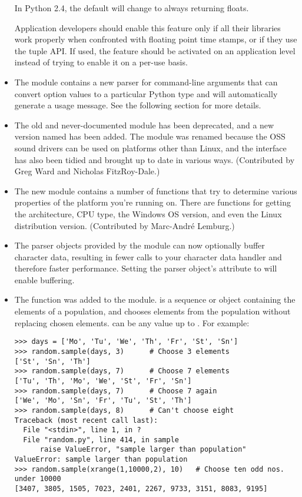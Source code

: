\documentclass{howto}
\begin{document}
\begin{itemize}
In Python 2.4, the default will change to always returning floats.

Application developers should enable this feature only if all their
libraries work properly when confronted with floating point time
stamps, or if they use the tuple API. If used, the feature should be
activated on an application level instead of trying to enable it on a
per-use basis.

\item The  module contains a new parser for command-line arguments 
that can convert option values to a particular Python type 
and will automatically generate a usage message.  See the following section for 
more details.

\item The old and never-documented  module has
been deprecated, and a new version named  has been
added.  The module was renamed because the OSS sound drivers can be
used on platforms other than Linux, and the interface has also been
tidied and brought up to date in various ways. (Contributed by Greg
Ward and Nicholas FitzRoy-Dale.)

\item The new  module contains a number of functions
that try to determine various properties of the platform you're
running on.  There are functions for getting the architecture, CPU
type, the Windows OS version, and even the Linux distribution version.
(Contributed by Marc-Andr\'e Lemburg.)

\item The parser objects provided by the  module
can now optionally buffer character data, resulting in fewer calls to
your character data handler and therefore faster performance.  Setting
the parser object's  attribute to 
will enable buffering.

\item The  function was
added to the  module.   is a sequence or
 object containing the elements of a population, and
 chooses  elements from the population without
replacing chosen elements.   can be any value up to
. For example:

\begin{verbatim}
>>> days = ['Mo', 'Tu', 'We', 'Th', 'Fr', 'St', 'Sn']
>>> random.sample(days, 3)      # Choose 3 elements
['St', 'Sn', 'Th']
>>> random.sample(days, 7)      # Choose 7 elements
['Tu', 'Th', 'Mo', 'We', 'St', 'Fr', 'Sn']
>>> random.sample(days, 7)      # Choose 7 again
['We', 'Mo', 'Sn', 'Fr', 'Tu', 'St', 'Th']
>>> random.sample(days, 8)      # Can't choose eight
Traceback (most recent call last):
  File "<stdin>", line 1, in ?
  File "random.py", line 414, in sample
      raise ValueError, "sample larger than population"
ValueError: sample larger than population
>>> random.sample(xrange(1,10000,2), 10)   # Choose ten odd nos. under 10000
[3407, 3805, 1505, 7023, 2401, 2267, 9733, 3151, 8083, 9195]
\end{verbatim}


\end{itemize}
\end{document}
